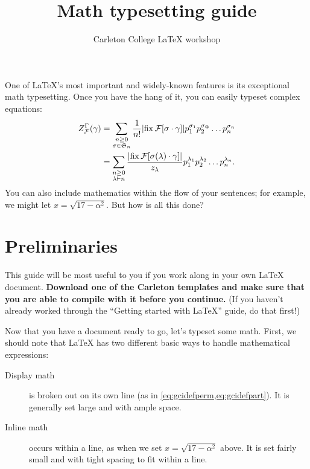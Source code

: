 \documentclass{article}
\title{Math typesetting guide}
\author{Carleton College \LaTeX{} workshop}
\date{}
\newcommand*{\inst}[1]{\textbf{#1}}
\begin{document}
\maketitle

One of \LaTeX{}'s most important and widely-known features is its exceptional math typesetting.
Once you have the hang of it, you can easily typeset complex equations:
\begin{subequations}
  \label{eq:gcidef}
  \begin{align}
    Z_{\mathcal{F}}^{\Gamma} (\gamma) &= \sum_{\substack{n \geq 0 \\ \sigma \in \mathfrak{S}_{n}}} \frac{1}{n!} \abs*{ \operatorname{fix} \mathcal{F} \sbrac{ \sigma \cdot \gamma } } p_{1}^{\sigma_{1}} p_{2}^{\sigma_{@}} \dots p_{n}^{\sigma_{n}} \label{eq:gcidefperm} \\
    &= \sum_{\substack{n \geq 0 \\ \lambda \vdash n}} \frac{\abs*{ \operatorname{fix} \mathcal{F} \sbrac{\sigma(\lambda) \cdot \gamma} }}{z_{\lambda}} p_{1}^{\lambda_{1}} p_{2}^{\lambda_{2}} \dots p_{n}^{\lambda_{n}}. \label{eq:gcidefpart}
  \end{align}
\end{subequations}
You can also include mathematics within the flow of your sentences; for example, we might let $x = \sqrt{17 - \alpha^{2}}$.
But how is all this done?

\section{Preliminaries}
This guide will be most useful to you if you work along in your own \LaTeX{} document.
\inst{Download one of the Carleton templates and make sure that you are able to compile with it before you continue.}
(If you haven't already worked through the \enquote{Getting started with \LaTeX{}} guide, do that first!)

Now that you have a document ready to go, let's typeset some math.
First, we should note that \LaTeX{} has two different basic ways to handle mathematical expressions:
\begin{description}
\item[Display math]
  is broken out on its own line (as in \cref{eq:gcidefperm,eq:gcidefpart}).
  It is generally set large and with ample space.

\item[Inline math]
  occurs within a line, as when we set $x = \sqrt{17 - \alpha^{2}}$ above.
  It is set fairly small and with tight spacing to fit within a line.
\end{description}
\end{document}
